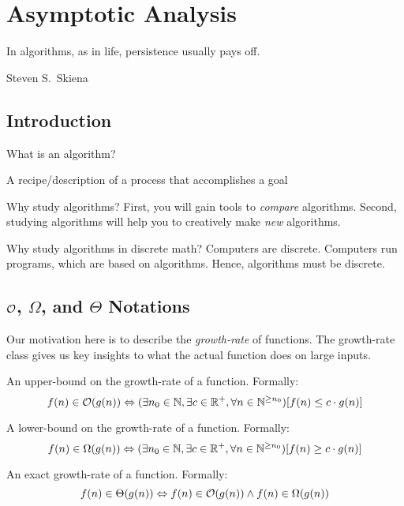 \documentclass[main.tex]{subfiles}
\begin{document}
\chapter{Asymptotic Analysis}

\epigraph{In algorithms, as in life, persistence usually pays off.}{Steven S.\ Skiena}

\minitoc

\section{Introduction}

What is an algorithm?

\begin{defn}[Algorithm]
	A recipe/description of a process that accomplishes a goal
\end{defn}

Why study algorithms? First, you will gain tools to \textit{compare} algorithms. Second, studying algorithms will help you to creatively make \textit{new} algorithms.

Why study algorithms in discrete math? Computers are discrete. Computers run programs, which are based on algorithms. Hence, algorithms must be discrete.

\section{\(\mathcal{O}\), \(\Omega\), and \(\Theta\) Notations}

Our motivation here is to describe the \textit{growth-rate} of functions. The growth-rate class gives us key insights to what the actual function does on large inputs.

\begin{defn}[Big-Oh]
	An upper-bound on the growth-rate of a function. Formally: \[f(n) \in \mathcal{O}(g(n)) \Leftrightarrow (\exists n_0 \in \mathbb{N}, \exists c \in \mathbb{R}^+, \forall n \in \mathbb{N}^{\geq n_0})[f(n) \leq c \cdot g(n)]\]
\end{defn}

\begin{defn}
	A lower-bound on the growth-rate of a function. Formally: \[f(n) \in \Omega(g(n)) \Leftrightarrow (\exists n_0 \in \mathbb{N}, \exists c \in \mathbb{R}^+, \forall n \in \mathbb{N}^{\geq n_0})[f(n) \geq c \cdot g(n)]\]
\end{defn}

\begin{defn}
	An exact growth-rate of a function. Formally: \[f(n) \in \Theta(g(n)) \Leftrightarrow f(n) \in \mathcal{O}(g(n)) \land f(n) \in \Omega(g(n))\]
\end{defn}
\end{document}

